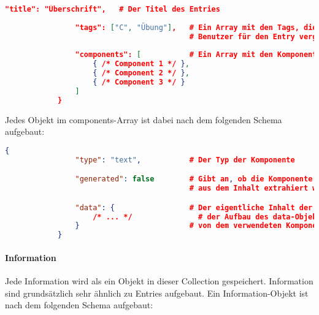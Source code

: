 \begin{lstlisting}[language=JSON]
				"title": "Überschrift",   # Der Titel des Entries
				
				"tags": ["C", "Übung"],   # Ein Array mit den Tags, die der 
				                          # Benutzer für den Entry vergeben hat.
				
				"components": [           # Ein Array mit den Komponenten des Entry
					{ /* Component 1 */ },
					{ /* Component 2 */ },
					{ /* Component 3 */ }
				]
			}
		\end{lstlisting}

		Jedes Objekt im components-Array ist dabei nach dem folgenden Schema aufgebaut:

		\begin{lstlisting}[language=JSON]
			{
				"type": "text",           # Der Typ der Komponente

				"generated": false        # Gibt an, ob die Komponente von Norbert
				                          # aus dem Inhalt extrahiert wurde.

				"data": {                 # Der eigentliche Inhalt der Komponente.
					/* ... */               # der Aufbau des data-Objekts ist abhängig
				}                         # von dem verwendeten Komponenten-Typ.
			}
		\end{lstlisting}
	\paragraph{Information} %
	\label{par:informations}
		
		Jede Information wird als ein Objekt in dieser Collection gespeichert. Information sind grundsätzlich sehr ähnlich zu Entries aufgebaut. Ein Information-Objekt ist nach dem folgenden Schema aufgebaut:

